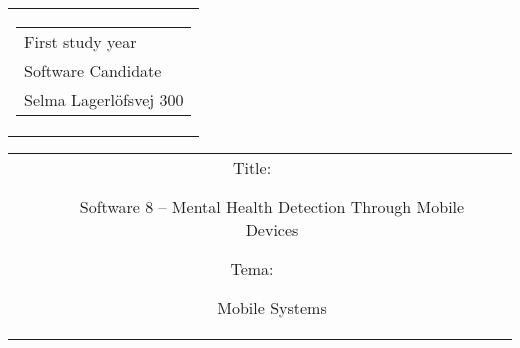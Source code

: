 

\thispagestyle{empty}
\begin{titlingpage}
 \begin{nopagebreak}
 {\samepage 
 \begin{tabular}{r}
\parbox{\textwidth}{  
 \hfill \parbox{4.9cm}{\begin{tabular}{l}
{\small First study year} \\
{\small Software Candidate} \\
{\small Selma Lagerlöfsvej 300} \\
 \end{tabular}}
}
\end{tabular}

 \begin{tabular}{cc}
\parbox{7cm}{
\begin{description}

\item[Title:] 

Software 8 -- Mental Health Detection Through Mobile Devices
  
\item[Tema:]

Mobile Systems


 \end{description}

\parbox{8cm}{

}}
\end{tabular}}
\end{nopagebreak}
\end{titlingpage}

